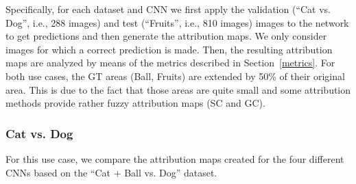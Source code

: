 \documentclass[runningheads]{llncs}
\begin{document}
Specifically, for each dataset and CNN we first apply the validation (\enquote{Cat vs. Dog}, i.e., 288 images) and test (\enquote{Fruits}, i.e., 810 images) images to the network to get predictions and then generate the attribution maps. We only consider images for which a correct prediction is made. Then, the resulting attribution maps are analyzed by means of the metrics described in Section~\ref{metrics}. For both use cases, the GT areas (Ball, Fruits) are extended by 50\% of their original area.
This is due to the fact that those areas are quite small and some attribution methods provide rather fuzzy attribution maps (SC and GC).

\subsubsection{Cat vs. Dog}
For this use case, we compare the attribution maps created for the four different CNNs based on the \enquote{Cat + Ball vs. Dog} dataset.
\end{document}

